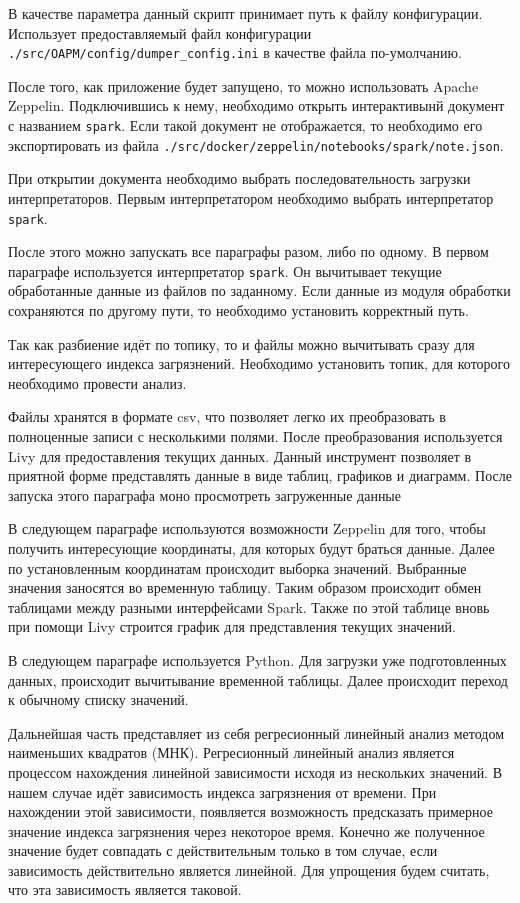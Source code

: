 В качестве параметра данный скрипт принимает путь к файлу конфигурации.
Использует предоставляемый файл конфигурации \texttt{./src/OAPM/config/dumper\_config.ini} в качестве файла по-умолчанию.

После того, как приложение будет запущено, то можно использовать Apache Zeppelin.
Подключившись к нему, необходимо открыть интерактивынй документ с названием \texttt{spark}.
Если такой документ не отображается, то необходимо его экспортировать из файла \texttt{./src/docker/zeppelin/notebooks/spark/note.json}. 

При открытии документа необходимо выбрать последовательность загрузки интерпретаторов.
Первым интерпретатором необходимо выбрать интерпретатор \texttt{spark}.

После этого можно запускать все параграфы разом, либо по одному.
В первом параграфе используется интерпретатор \texttt{spark}. 
Он вычитывает текущие обработанные данные из файлов по заданному.
Если данные из модуля обработки сохраняются по другому пути, то необходимо установить корректный путь.

Так как разбиение идёт по топику, то и файлы можно вычитывать сразу для интересующего индекса загрязнений.
Необходимо установить топик, для которого необходимо провести анализ.

Файлы хранятся в формате csv, что позволяет легко их преобразовать в полноценные записи с несколькими полями.
После преобразования используется Livy для предоставления текущих данных.
Данный инструмент позволяет в приятной форме представлять данные в виде таблиц, графиков и диаграмм.
После запуска этого параграфа моно просмотреть загруженные данные 

В следующем параграфе используются возможности Zeppelin для того, чтобы получить интересующие координаты, для которых будут браться данные.
Далее по установленным координатам происходит выборка значений.
Выбранные значения заносятся во временную таблицу.
Таким образом происходит обмен таблицами между разными интерфейсами Spark.
Также по этой таблице вновь при помощи Livy строится график для представления текущих значений.

В следующем параграфе используется Python.
Для загрузки уже подготовленных данных, происходит вычитывание временной таблицы.
Далее происходит переход к обычному списку значений.

Дальнейшая часть представляет из себя регресионный линейный анализ методом наименьших квадратов (МНК).
Регресионный линейный анализ является процессом нахождения линейной зависимости исходя из нескольких значений.
В нашем случае идёт зависимость индекса загрязнения от времени.
При нахождении этой зависимости, появляется возможность предсказать примерное значение индекса загрязнения через некоторое время.
Конечно же полученное значение будет совпадать с действительным только в том случае, если зависимость действительно является линейной.
Для упрощения будем считать, что эта зависимость является таковой.

